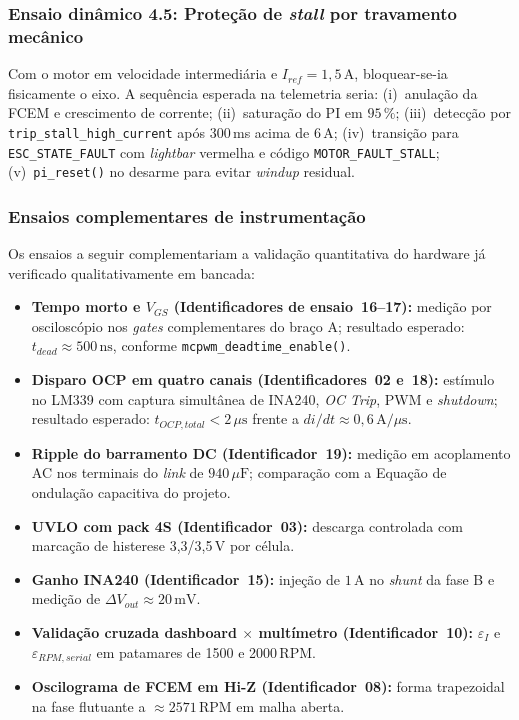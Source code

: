 \subsubsection{Ensaio dinâmico 4.5: Proteção de \textit{stall} por travamento mecânico}

Com o motor em velocidade intermediária e $I_{ref} = 1{,}5\,\text{A}$, bloquear-se-ia fisicamente o eixo. A sequência esperada na telemetria seria: (i)~anulação da FCEM e crescimento de corrente; (ii)~saturação do PI em $95\,\%$; (iii)~detecção por \texttt{trip\_stall\_high\_current} após 300\,ms acima de 6\,A; (iv)~transição para \texttt{ESC\_STATE\_FAULT} com \textit{lightbar} vermelha e código \texttt{MOTOR\_FAULT\_STALL}; (v)~\texttt{pi\_reset()} no desarme para evitar \textit{windup} residual.

\subsubsection{Ensaios complementares de instrumentação}

Os ensaios a seguir complementariam a validação quantitativa do hardware já verificado qualitativamente em bancada:

\begin{itemize}
    \item \textbf{Tempo morto e $V_{GS}$ (Identificadores de ensaio~16--17):} medição por osciloscópio nos \textit{gates} complementares do braço A; resultado esperado: $t_{dead} \approx 500\,\text{ns}$, conforme \texttt{mcpwm\_deadtime\_enable()}.
    \item \textbf{Disparo OCP em quatro canais (Identificadores~02 e~18):} estímulo no LM339 com captura simultânea de INA240, \textit{OC Trip}, PWM e \textit{shutdown}; resultado esperado: $t_{OCP,total} < 2\,\mu\text{s}$ frente a $di/dt \approx 0{,}6\,\text{A}/\mu\text{s}$.
    \item \textbf{Ripple do barramento DC (Identificador~19):} medição em acoplamento AC nos terminais do \textit{link} de $940\,\mu\text{F}$; comparação com a Equação de ondulação capacitiva do projeto.
    \item \textbf{UVLO com pack 4S (Identificador~03):} descarga controlada com marcação de histerese 3,3/3,5\,V por célula.
    \item \textbf{Ganho INA240 (Identificador~15):} injeção de $1\,\text{A}$ no \textit{shunt} da fase B e medição de $\Delta V_{out} \approx 20\,\text{mV}$.
    \item \textbf{Validação cruzada dashboard $\times$ multímetro (Identificador~10):} $\varepsilon_I$ e $\varepsilon_{RPM,serial}$ em patamares de 1500 e 2000\,RPM.
    \item \textbf{Oscilograma de FCEM em Hi-Z (Identificador~08):} forma trapezoidal na fase flutuante a $\approx 2571\,\text{RPM}$ em malha aberta.
\end{itemize}

